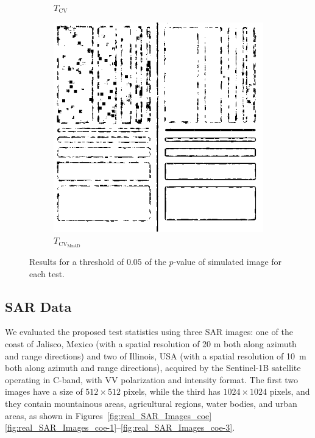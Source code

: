 \begin{figure}[H]
\begin{subfigure}[b]{0.3\textwidth}
    \caption{$T_\text{CV}$}
    \label{fig:sim_SAR_Images_p05-2}
  \end{subfigure}
  \hfill
  \begin{subfigure}[b]{0.3\textwidth}
    \centering
    \includegraphics[width=\textwidth]{../../Figures/PNG/mnad_005_Phantom_7_z1}
     \caption{$T_{\text{CV}_{\text{MnAD}}}$}
    \label{fig:sim_SAR_Images_p05-3}
  \end{subfigure}
  \caption{Results for a threshold of $0.05$ of the $p$-value of simulated image for each test. }
  \label{fig:sim_SAR_Images_p05}
\end{figure}




\subsection{SAR Data}\label{sar-data}

We evaluated the proposed test statistics using three SAR images: one of
the coast of Jalisco, Mexico (with a spatial resolution of 20 m both
along azimuth and range directions) and two of Illinois, USA (with a
spatial resolution of \SI{10}{\meter} both along azimuth and range
directions), acquired by the Sentinel-1B satellite operating in C-band,
with VV polarization and intensity format. 
The first two images have a size of \(512 \times 512\) pixels, while the third has
\(1024 \times 1024\) pixels, and they contain mountainous areas,
agricultural regions, water bodies, and urban areas, as shown in
Figures~\ref{fig:real_SAR_Images_coe} \ref{fig:real_SAR_Images_coe-1}--\ref{fig:real_SAR_Images_coe-3}.

